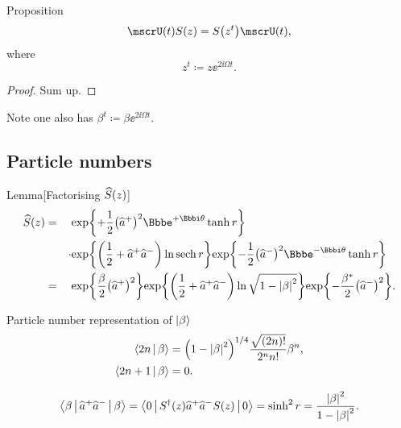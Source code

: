 \begin{namedthm}{Proposition}
\begin{equation}
\rfun{\mscrU}{t}\rfun{S}{z}	= \rfun{S}{z^t}\rfun{\mscrU}{t},
\end{equation}
where
\begin{equation}
z^t \coloneqq z\ee^{2\ii\Omega t}.
\end{equation}

\end{namedthm} %
\begin{proof}
Sum up.
\end{proof}

Note one also has $\beta^t \coloneqq \beta \ee^{2\ii\Omega t}$.


\subsection{Particle numbers}

\begin{namedthm}{Lemma}[Factorising ${\widehat{S}}\mathopen{}\left(z\right)\mathclose{}$]
\begin{alignat}{3}
\rfun{\widehat{S}}{z} &=&&
\cfun{\exp}{+\frac{1}{2}\rbr{\widehat{a}^+}^2\ee^{+\ii\theta}\tanh r}
\nonumber \\
&&\cdot& \cfun{\exp}{\rbr{\frac{1}{2}+\widehat{a}^+\widehat{a}^-}\ln\sech r}
\cfun{\exp}{-\frac{1}{2}\rbr{\widehat{a}^-}^2\ee^{-\ii\theta}\tanh r}
\\
&=&&\cfun{\exp}{\frac{\beta}{2} \rbr{\widehat{a}^+}^2} 
\cfun{\exp}{\rbr{\frac{1}{2}+\widehat{a}^+\widehat{a}^-} 
\ln\sqrt{1-\vbr{\beta}^2}}
\cfun{\exp}{-\frac{\beta^*}{2}\rbr{\widehat{a}^-}^2}.
\end{alignat}
\end{namedthm} %

\begin{nameddef}{Particle number representation of $\Ket{\beta}$}
\begin{align}
\Braket{2n | \beta} &= {\left(1-{\left|\beta\right|}^2\right)}^{1/4}
\frac{\sqrt{{\left(2n\right)}!}}{2^n n!}\beta^n, \\
\Braket{2n+1 | \beta} &= 0.
\end{align}

\end{nameddef}


\begin{equation}
	\Braket{\beta | \widehat{a}^+\widehat{a}^- | \beta}
	= \Braket{0 | {S^\dagger}\mathopen{}\left(z\right)\mathclose{}\widehat{a}^+
	\widehat{a}^-{S}\mathopen{}\left(z\right)\mathclose{} | 0}
	= \sinh^2 r = \frac{{\left|\beta\right|}^2}{1-{\left|\beta\right|}^2}.
\end{equation}

